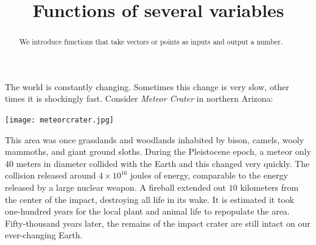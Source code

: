 \documentclass{ximera}
\title[Dig-In:]{Functions of several variables}
\begin{document}
\begin{abstract}
  We introduce functions that take vectors or points as inputs and
  output a number.
\end{abstract}
\maketitle


The world is constantly changing. Sometimes this change is very slow,
other times it is shockingly fast. Consider \textit{Meteor Crater} in
northern Arizona:
\begin{image}[3in]
  \texttt{[image: meteorcrater.jpg]}
\end{image}
This area was once grasslands and woodlands inhabited by bison,
camels, wooly mammoths, and giant ground sloths. During the
Pleistocene epoch, a meteor only $40$ meters in diameter collided
with the Earth and this changed very quickly. The collision released
around $4\times10^{16}$ joules of energy, comparable to the energy
released by a large nuclear weapon. A fireball extended out $10$
kilometers from the center of the impact, destroying all life in its
wake. It is estimated it took one-hundred years for the local plant
and animal life to repopulate the area.  Fifty-thousand years later,
the remains of the impact crater are still intact on our ever-changing
Earth.
\end{document}
